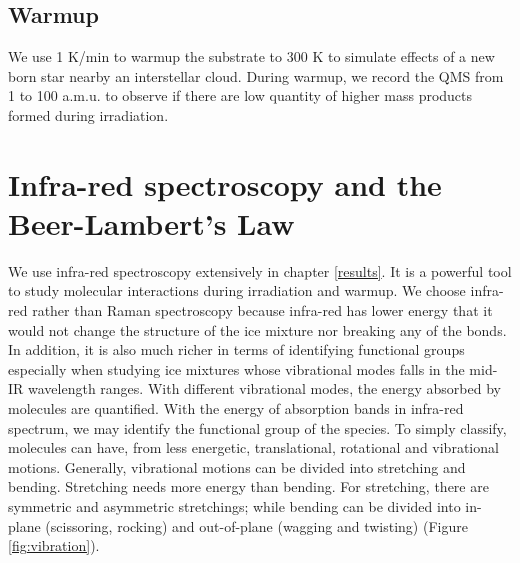 \subsection{Warmup}
We use 1 K/min to warmup the substrate to 300 K to simulate effects of a new born star nearby an interstellar cloud. During warmup, we record the QMS from 1 to 100 a.m.u. to observe if there are low quantity of higher mass products formed during irradiation.

\section{Infra-red spectroscopy and the Beer-Lambert’s Law}
\label{sec:spectroscopy}
We use infra-red spectroscopy extensively in chapter \ref{results}. It is a powerful tool to study molecular interactions during irradiation and warmup. We choose infra-red rather than Raman spectroscopy because infra-red has lower energy that it would not change the structure of the ice mixture nor breaking any of the bonds. In addition, it is also much richer in terms of identifying functional groups especially when studying ice mixtures whose vibrational modes falls in the mid-IR wavelength ranges. With different vibrational modes, the energy absorbed by molecules are quantified. With the energy of absorption bands in infra-red spectrum, we may identify the functional group of the species. To simply classify, molecules can have, from less energetic, translational, rotational and vibrational motions. Generally, vibrational motions can be divided into stretching and bending. Stretching needs more energy than bending. For stretching, there are symmetric and asymmetric stretchings; while bending can be divided into in-plane (scissoring, rocking) and out-of-plane (wagging and twisting) (Figure \ref{fig:vibration}).
